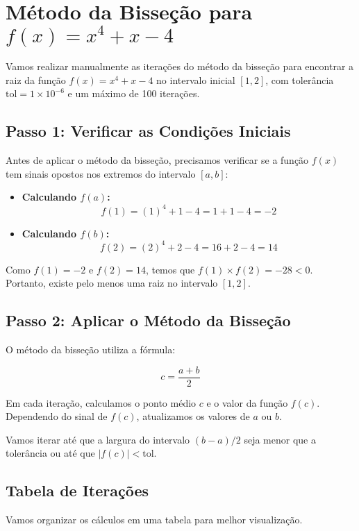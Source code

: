 \documentclass{article}
\begin{document}
\section*{Método da Bisseção para $f(x) = x^4 + x - 4$}

Vamos realizar manualmente as iterações do método da bisseção para encontrar a raiz da função \( f(x) = x^4 + x - 4 \) no intervalo inicial \([1, 2]\), com tolerância \( \text{tol} = 1 \times 10^{-6} \) e um máximo de 100 iterações.

\subsection*{Passo 1: Verificar as Condições Iniciais}

Antes de aplicar o método da bisseção, precisamos verificar se a função \( f(x) \) tem sinais opostos nos extremos do intervalo \([a, b]\):

\begin{itemize}
    \item \textbf{Calculando \( f(a) \):}
    \[
    f(1) = (1)^4 + 1 - 4 = 1 + 1 - 4 = -2
    \]
    \item \textbf{Calculando \( f(b) \):}
    \[
    f(2) = (2)^4 + 2 - 4 = 16 + 2 - 4 = 14
    \]
\end{itemize}

Como \( f(1) = -2 \) e \( f(2) = 14 \), temos que \( f(1) \times f(2) = -28 < 0 \). Portanto, existe pelo menos uma raiz no intervalo \([1, 2]\).

\subsection*{Passo 2: Aplicar o Método da Bisseção}

O método da bisseção utiliza a fórmula:

\[
c = \frac{a + b}{2}
\]

Em cada iteração, calculamos o ponto médio \( c \) e o valor da função \( f(c) \). Dependendo do sinal de \( f(c) \), atualizamos os valores de \( a \) ou \( b \).

Vamos iterar até que a largura do intervalo \( (b - a)/2 \) seja menor que a tolerância ou até que \( |f(c)| < \text{tol} \).

\subsection*{Tabela de Iterações}

Vamos organizar os cálculos em uma tabela para melhor visualização.
\end{document}
